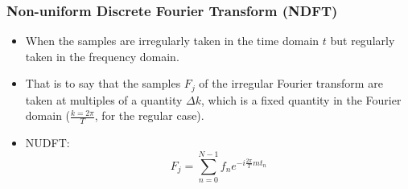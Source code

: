 \documentclass{beamer}
\begin{document}
\begin{frame}
\frametitle{Non-uniform Discrete Fourier Transform (NDFT)}
\begin{itemize}
\item When the samples are irregularly taken in the time
domain $t$ but regularly taken in the frequency domain.

\item That is to say that the samples $F_{j}$ of the irregular Fourier
  transform are taken at multiples of a quantity $\Delta k$, which is
  a fixed quantity in the Fourier domain ($\frac{k=2 \pi}{T}$, for the
  regular case).

\item NUDFT:
$$F_{j}=\sum_{n=0}^{N-1}f_{n}e^{-i\frac{2 \pi}{T}m t_{n}}$$

\end{itemize}

\end{frame}
\end{document}
